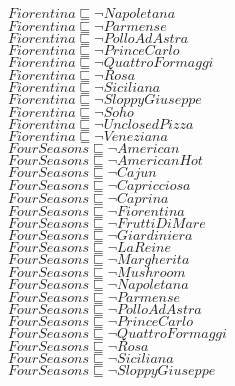 \documentclass[a4paper,10pt]{article}
\begin{document}
 $Fiorentina \sqsubseteq  \lnot Napoletana$\\ 
 $Fiorentina \sqsubseteq  \lnot Parmense$\\ 
 $Fiorentina \sqsubseteq  \lnot PolloAdAstra$\\ 
 $Fiorentina \sqsubseteq  \lnot PrinceCarlo$\\ 
 $Fiorentina \sqsubseteq  \lnot QuattroFormaggi$\\ 
 $Fiorentina \sqsubseteq  \lnot Rosa$\\ 
 $Fiorentina \sqsubseteq  \lnot Siciliana$\\ 
 $Fiorentina \sqsubseteq  \lnot SloppyGiuseppe$\\ 
 $Fiorentina \sqsubseteq  \lnot Soho$\\ 
 $Fiorentina \sqsubseteq  \lnot UnclosedPizza$\\ 
 $Fiorentina \sqsubseteq  \lnot Veneziana$\\ 
 $FourSeasons \sqsubseteq  \lnot American$\\ 
 $FourSeasons \sqsubseteq  \lnot AmericanHot$\\ 
 $FourSeasons \sqsubseteq  \lnot Cajun$\\ 
 $FourSeasons \sqsubseteq  \lnot Capricciosa$\\ 
 $FourSeasons \sqsubseteq  \lnot Caprina$\\ 
 $FourSeasons \sqsubseteq  \lnot Fiorentina$\\ 
 $FourSeasons \sqsubseteq  \lnot FruttiDiMare$\\ 
 $FourSeasons \sqsubseteq  \lnot Giardiniera$\\ 
 $FourSeasons \sqsubseteq  \lnot LaReine$\\ 
 $FourSeasons \sqsubseteq  \lnot Margherita$\\ 
 $FourSeasons \sqsubseteq  \lnot Mushroom$\\ 
 $FourSeasons \sqsubseteq  \lnot Napoletana$\\ 
 $FourSeasons \sqsubseteq  \lnot Parmense$\\ 
 $FourSeasons \sqsubseteq  \lnot PolloAdAstra$\\ 
 $FourSeasons \sqsubseteq  \lnot PrinceCarlo$\\ 
 $FourSeasons \sqsubseteq  \lnot QuattroFormaggi$\\ 
 $FourSeasons \sqsubseteq  \lnot Rosa$\\ 
 $FourSeasons \sqsubseteq  \lnot Siciliana$\\ 
 $FourSeasons \sqsubseteq  \lnot SloppyGiuseppe$\\ 
\end{document}
